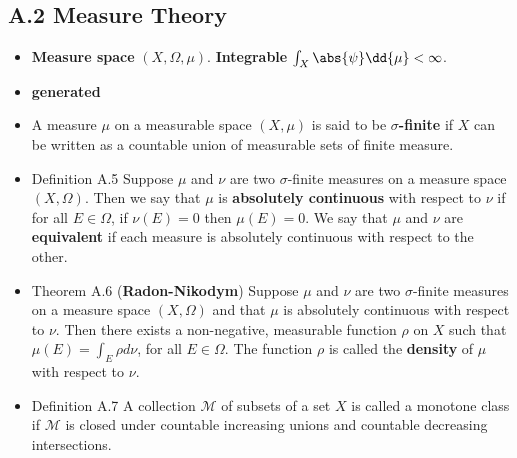 
\subsection{A.2 Measure Theory}

\begin{itemize}
\item \textbf{Measure space} $(X,\Omega,\mu)$. \textbf{Integrable} $\int_X \abs{\psi} \dd{\mu} < \infty$.

\item \textbf{generated}

\item A measure $\mu$ on a measurable space $(X, \mu)$ is said to be \textbf{$\sigma$-finite} if $X$ can be written as a countable union of measurable sets of finite measure.

\item Definition A.5 Suppose $\mu$ and $\nu$ are two $\sigma$-finite measures on a measure space $(X, \Omega)$. Then we say that $\mu$ is \textbf{absolutely continuous} with respect to $\nu$ if for all $E \in \Omega$, if $\nu(E)=0$ then $\mu(E)=0$. We say that $\mu$ and $\nu$ are \textbf{equivalent} if each measure is absolutely continuous with respect to the other.

\item Theorem A.6 (\textbf{Radon-Nikodym}) Suppose $\mu$ and $\nu$ are two $\sigma$-finite measures on a measure space $(X, \Omega)$ and that $\mu$ is absolutely continuous with respect to $\nu$. Then there exists a non-negative, measurable function $\rho$ on $X$ such that $\mu(E)=\int_{E} \rho d \nu$, for all $E \in \Omega$. The function $\rho$ is called the \textbf{density} of $\mu$ with respect to $\nu$.

\item Definition A.7 A collection $\mathcal{M}$ of subsets of a set $X$ is called a monotone class if $\mathcal{M}$ is closed under countable increasing unions and countable decreasing intersections.
\end{itemize}


